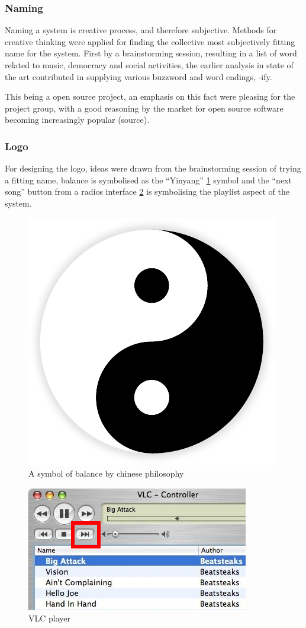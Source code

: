 
\subsubsection{Naming}
Naming a system is creative process, and therefore subjective. Methods for creative thinking were applied for finding the collective most subjectively fitting name for the system. First by a brainstorming session, resulting in a list of word related to music, democracy and social activities, the earlier analysis in state of the art contributed in supplying various buzzword and word endings, -ify.

This being a open source project, an emphasis on this fact were pleasing for the project group, with a good reasoning by the market for open source software becoming increasingly popular (source).

\subsubsection{Logo}
For designing the logo, ideas were drawn from the brainstorming session of trying a fitting name, balance is symbolised as the \enquote{Yinyang} \cref{fig:yinyang} symbol and the \enquote{next song} button from a radios interface \cref{fig:vlc} is symbolising the playlist aspect of the system.

\begin{figure}
  \centering
  \includegraphics[width=0.2\linewidth]{Images/Yin-Yang}
  \caption{A symbol of balance by chinese philosophy \cite{yinyangsource} }
  \label{fig:yinyang}
\end{figure}

\begin{figure}
  \centering
  \includegraphics[width=0.3\linewidth]{Images/vlc.jpg}
  \caption{VLC player}
  \label{fig:vlc}
\end{figure}

